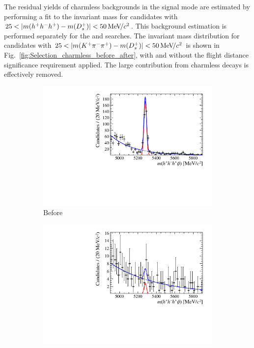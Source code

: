 The residual yields of charmless backgrounds in the signal mode are estimated by performing a fit to the \Bp invariant mass for candidates with $25 < |m(h^{+}h^{-}h^{+}) - m({{D}^+_{s}})| < 50{\mathrm{\,Me\kern -0.1em V\!/}c^2} $. This background estimation is performed separately for the \decay{\Bp}{\Dsp\phiz} and \decay{\Bp}{\Dsp\Kp\Km} searches. 
The invariant mass distribution for \decay{\Bp}{(\decay{\Dsp}{\Kp\pim\pip})\phiz} candidates with $25 < |m({{K}^+}{{\pi}^-}{{\pi}^+}) - m({{D}^+_{s}})| < 50{\mathrm{\,Me\kern -0.1em V\!/}c^2}$ is shown in Fig.~\ref{fig:Selection_charmless_before_after}, with and without the flight distance significance requirement applied. The large contribution from charmless decays is effectively removed.
\begin{figure}[!h]
    \centering
    \begin{subfigure}[t]{0.4\textwidth}
        \includegraphics[width=1.0\textwidth]{figs/Selection/Signal_Ds2KPiPi_Test2_0_000000_DslessFDCHI2.pdf}
        \caption{Before}
    \end{subfigure}%
    \begin{subfigure}[t]{0.4\textwidth}
        \includegraphics[width=1.0\textwidth]{figs/Selection/Signal_Ds2KPiPi_Test2_25_000000_DslessFDCHI2.pdf}

\end{subfigure}
\end{figure}
